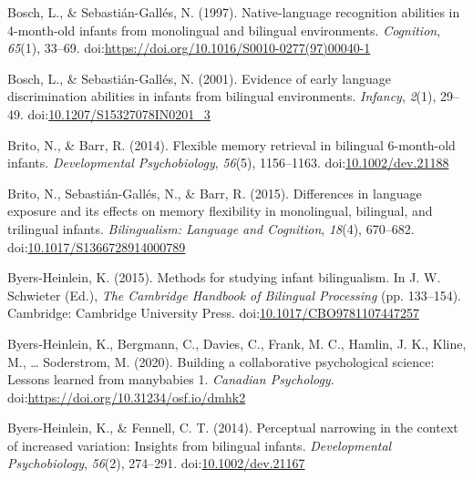 \documentclass[,man,floatsintext]{apa6}
\begin{document}
\leavevmode\hypertarget{ref-bosch_1997}{}%
Bosch, L., \& Sebastián-Gallés, N. (1997). Native-language recognition abilities in 4-month-old infants from monolingual and bilingual environments. \emph{Cognition}, \emph{65}(1), 33--69. doi:\href{https://doi.org/https://doi.org/10.1016/S0010-0277(97)00040-1}{https://doi.org/10.1016/S0010-0277(97)00040-1}

\leavevmode\hypertarget{ref-bosch_2001}{}%
Bosch, L., \& Sebastián-Gallés, N. (2001). Evidence of early language discrimination abilities in infants from bilingual environments. \emph{Infancy}, \emph{2}(1), 29--49. doi:\href{https://doi.org/10.1207/S15327078IN0201_3}{10.1207/S15327078IN0201\_3}

\leavevmode\hypertarget{ref-brito_2014}{}%
Brito, N., \& Barr, R. (2014). Flexible memory retrieval in bilingual 6-month-old infants. \emph{Developmental Psychobiology}, \emph{56}(5), 1156--1163. doi:\href{https://doi.org/10.1002/dev.21188}{10.1002/dev.21188}

\leavevmode\hypertarget{ref-brito_2015}{}%
Brito, N., Sebastián-Gallés, N., \& Barr, R. (2015). Differences in language exposure and its effects on memory flexibility in monolingual, bilingual, and trilingual infants. \emph{Bilingualism: Language and Cognition}, \emph{18}(4), 670--682. doi:\href{https://doi.org/10.1017/S1366728914000789}{10.1017/S1366728914000789}

\leavevmode\hypertarget{ref-byers_heinlein_2015}{}%
Byers-Heinlein, K. (2015). Methods for studying infant bilingualism. In J. W. Schwieter (Ed.), \emph{The Cambridge Handbook of Bilingual Processing} (pp. 133--154). Cambridge: Cambridge University Press. doi:\href{https://doi.org/10.1017/CBO9781107447257}{10.1017/CBO9781107447257}

\leavevmode\hypertarget{ref-byers_heinlein_et_al_2019}{}%
Byers-Heinlein, K., Bergmann, C., Davies, C., Frank, M. C., Hamlin, J. K., Kline, M., \ldots{} Soderstrom, M. (2020). Building a collaborative psychological science: Lessons learned from manybabies 1. \emph{Canadian Psychology}. doi:\href{https://doi.org/https://doi.org/10.31234/osf.io/dmhk2}{https://doi.org/10.31234/osf.io/dmhk2}

\leavevmode\hypertarget{ref-byers_heinlein_2014}{}%
Byers-Heinlein, K., \& Fennell, C. T. (2014). Perceptual narrowing in the context of increased variation: Insights from bilingual infants. \emph{Developmental Psychobiology}, \emph{56}(2), 274--291. doi:\href{https://doi.org/10.1002/dev.21167}{10.1002/dev.21167}
\end{document}
